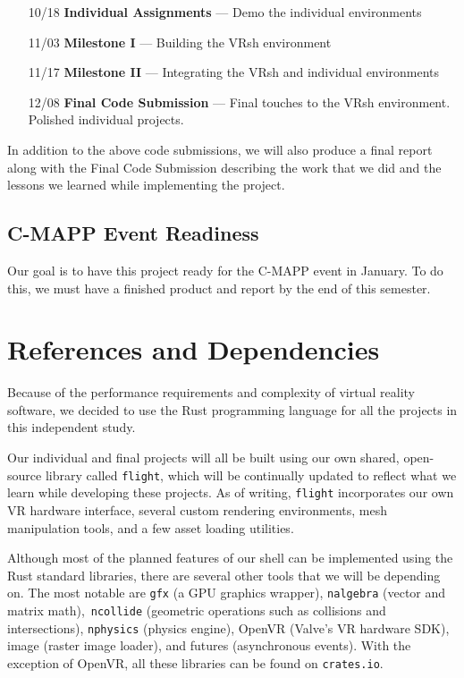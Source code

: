 \documentclass[titlepage,12pt]{article}
\begin{document}
\begin{enumerate}[leftmargin=*]
    \item [10/18] \textbf{Individual Assignments} --- Demo the individual
        environments
    \item [11/03] \textbf{Milestone I} --- Building the VRsh environment
    \item [11/17] \textbf{Milestone II} --- Integrating the VRsh and individual
        environments
    \item [12/08] \textbf{Final Code Submission} --- Final touches to the VRsh
        environment. Polished individual projects.
\end{enumerate}

In addition to the above code submissions, we will also produce a final report
along with the Final Code Submission describing the work that we did and the
lessons we learned while implementing the project.

\subsection{C-MAPP Event Readiness}
Our goal is to have this project ready for the C-MAPP event in January. To do
this, we must have a finished product and report by the end of this semester.

\section{References and Dependencies}

Because of the performance requirements and complexity of virtual reality
software, we decided to use the Rust programming language for all the projects
in this independent study.

Our individual and final projects will all be built using our own shared,
open-source library called \texttt{flight}, which will be continually updated to
reflect what we learn while developing these projects. As of writing,
\texttt{flight} incorporates our own VR hardware interface, several custom
rendering environments, mesh manipulation tools, and a few asset loading
utilities.

Although most of the planned features of our shell can be implemented using the
Rust standard libraries, there are several other tools that we will be depending
on.  The most notable are \texttt{gfx} (a GPU graphics wrapper),
\texttt{nalgebra} (vector and matrix math),\ \texttt{ncollide} (geometric
operations such as collisions and intersections), \texttt{nphysics} (physics
engine), OpenVR (Valve's VR hardware SDK), image (raster image loader), and
futures (asynchronous events). With the exception of OpenVR, all these libraries
can be found on \texttt{crates.io}.
\end{document}
